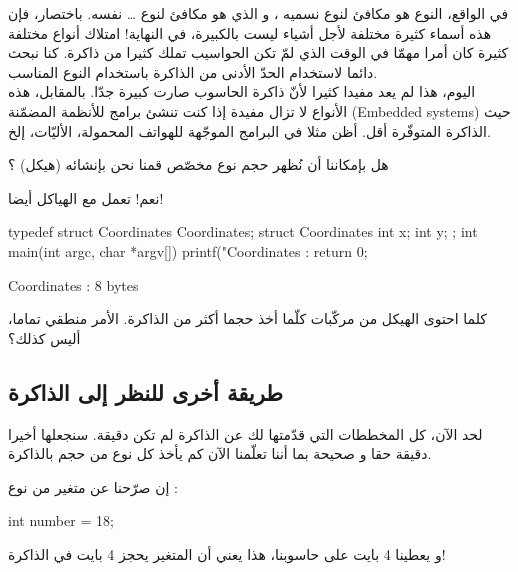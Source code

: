 \begin{information}
في الواقع، النوع
هو مكافئ لنوع نسميه
،
و الذي هو مكافئ لنوع \dots
{}
نفسه. باختصار، فإن هذه أسماء كثيرة مختلفة لأجل أشياء ليست بالكبيرة، في النهاية! امتلاك أنواع مختلفة كثيرة كان أمرا مهمّا  في الوقت الذي لمّ تكن الحواسيب تملك كثيرا من ذاكرة. كنا نبحث دائما لاستخدام الحدّ الأدنى من الذاكرة باستخدام النوع المناسب.\\
اليوم، هذا لم يعد مفيدا كثيرا لأنّ ذاكرة الحاسوب صارت كبيرة جدّا. بالمقابل، هذه الأنواع لا تزال مفيدة إذا كنت تنشئ برامج للأنظمة المضمّنة
(\textenglish{Embedded systems})
حيث الذاكرة المتوفّرة أقل. أظن مثلا في البرامج الموجّهة للهواتف المحمولة، الأليّات، إلخ.
\end{information}

\begin{question}
هل بإمكاننا أن نُظهر حجم نوع مخصّص قمنا نحن بإنشائه (هيكل) ؟
\end{question}

نعم!
تعمل مع الهياكل أيضا!

\begin{Csource}
typedef struct Coordinates Coordinates;
struct Coordinates
{
	int x;
	int y;
};
int main(int argc, char *argv[])
{
	printf("Coordinates  : %
	return 0;
}
\end{Csource}

\begin{Console}
Coordinates : 8 bytes
\end{Console}

كلما احتوى الهيكل من مركّبات كلّما أخذ حجما أكثر من الذاكرة. الأمر منطقي تماما، أليس كذلك؟

\subsection{طريقة أخرى للنظر إلى الذاكرة}

لحد الآن، كل المخططات التي قدّمتها لك عن الذاكرة لم تكن دقيقة. سنجعلها أخيرا دقيقة حقا و صحيحة بما أننا تعلّمنا الآن كم يأخذ كل نوع من حجم بالذاكرة.

إن صرّحنا عن متغير من نوع
 :

\begin{Csource}
int number = 18;
\end{Csource}

و
يعطينا 4 بايت على حاسوبنا، هذا يعني أن المتغير يحجز 4 بايت في الذاكرة!


